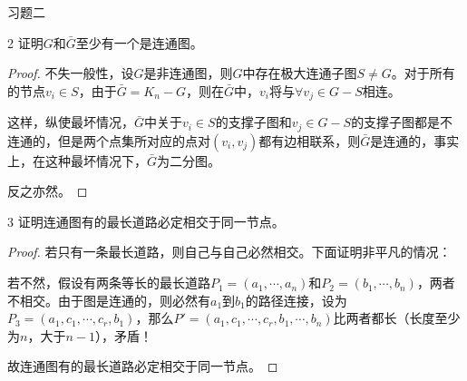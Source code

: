 \documentclass[12pt]{article}
\newenvironment{firstlayer}%
{\begin{list}{}{\renewcommand{\makelabel}[1]{\textbf{##1}.\hfil}
}}
{\end{list}}
\begin{document}
\begin{CJK}{UTF8}{gbsn}
\begin{firstlayer}
\begin{firstlayer}
  \end{firstlayer}
  \item[习题二]
  \begin{firstlayer}
    \item[2]证明$G$和$\bar{G}$至少有一个是连通图。
    
    \begin{proof}
      不失一般性，设$G$是非连通图，则$G$中存在极大连通子图$S\neq G$。对于所有的节点$v_i\in S$，由于$\bar{G}=K_n-G$，则在$\bar{G}$中，$v_i$将与$\forall v_j\in G-S$相连。
      
      这样，纵使最坏情况，$\bar{G}$中关于$v_i\in S$的支撑子图和$v_j\in G-S$的支撑子图都是不连通的，但是两个点集所对应的点对$(v_i,v_j)$都有边相联系，则$\bar{G}$是连通的，事实上，在这种最坏情况下，$\bar{G}$为二分图。

反之亦然。
    \end{proof}
    
    \item[3]证明连通图有的最长道路必定相交于同一节点。
    
    \begin{proof}
      若只有一条最长道路，则自己与自己必然相交。下面证明非平凡的情况：

若不然，假设有两条等长的最长道路$P_1=(a_1,\cdots,a_n)$和$P_2=(b_1,\cdots,b_n)$，两者不相交。由于图是连通的，则必然有$a_1$到$b_1$的路径连接，设为$P_3=(a_1,c_1,\cdots,c_r,b_1)$，那么$P'=(a_1,c_1,\cdots,c_r,b_1,\cdots,b_n)$比两者都长（长度至少为$n$，大于$n-1$），矛盾！

故连通图有的最长道路必定相交于同一节点。
    \end{proof}
  \end{firstlayer}
\end{firstlayer}


\end{CJK}
\end{document}
